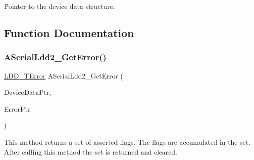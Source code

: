 Pointer to the device data structure. 

\subsection{Function Documentation}
\mbox{\label{group___a_serial_ldd2__module_gafab1fb38c1ca4d64933a973a271ad7b0}} 
\subsubsection{\texorpdfstring{A\+Serial\+Ldd2\+\_\+\+Get\+Error()}{ASerialLdd2\_GetError()}}
{\footnotesize\ttfamily \hyperlink{group___p_e___types__module_ga24c2b045fd04e79e85f261ce4df35588}{L\+D\+D\+\_\+\+T\+Error} A\+Serial\+Ldd2\+\_\+\+Get\+Error (\begin{DoxyParamCaption}\item[{\hyperlink{group___p_e___types__module_gac5cf1362f1f0e3a2ce71b1bf2276d091}{L\+D\+D\+\_\+\+T\+Device\+Data} $\ast$}]{Device\+Data\+Ptr,  }\item[{\hyperlink{group___p_e___types__module_ga3bd5d57e02458ce220540d0ad0462e06}{L\+D\+D\+\_\+\+S\+E\+R\+I\+A\+L\+\_\+\+T\+Error} $\ast$}]{Error\+Ptr }\end{DoxyParamCaption})}



This method returns a set of asserted flags. The flags are accumulated in the set. After calling this method the set is returned and cleared. 


